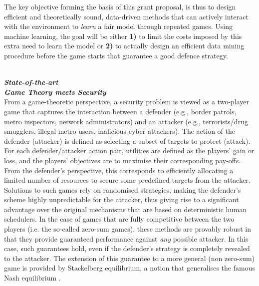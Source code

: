 The key objective forming the basis of this grant proposal, is thus to design efficient and theoretically sound, data-driven methods that can actively interact with the environment to {\em learn} a fair model through repeated games. Using machine learning, the goal will be either \textbf{1)} to limit the costs imposed by this extra need to learn the model or  \textbf{2)} to actually design an efficient data mining procedure before the game starts that guarantee a good defence strategy.




\noindent \textbf{\textit{\\State-of-the-art}}
\noindent \textbf{\textit{\\Game Theory meets Security}}\\
From a game-theoretic perspective, a security problem is viewed as a two-player game that captures the interaction between a defender (e.g., border patrols, metro inspectors, network administrators) and an attacker (e.g., terrorists/drug smugglers, illegal metro users, malicious cyber attackers). The action of the defender (attacker) is defined as selecting a subset of targets to protect (attack). For each defender/attacker action pair, utilities are defined as the players' gain or loss, and the players' objectives are to maximise their corresponding pay-offs. From the defender's perspective, this corresponds to efficiently allocating a limited number of resources to secure some predefined targets from the attacker. 
Solutions to such games rely on randomised strategies, making the defender's scheme highly unpredictable for the attacker, thus giving rise to a significant advantage over the original mechanisms that are based on deterministic human schedulers. In the case of games that are fully competitive between the two players  (i.e. the so-called zero-sum games), these methods are provably robust in that they provide guaranteed performance against {\em any} possible attacker. In this case, such guarantees hold, even if the defender's strategy is completely revealed to the attacker.  
The extension of this guarantee to a more general (non zero-sum) game is provided by Stackelberg equilibrium, a notion that generalises the famous Nash equilibrium \cite{korzhyk2011stackelberg}. 

